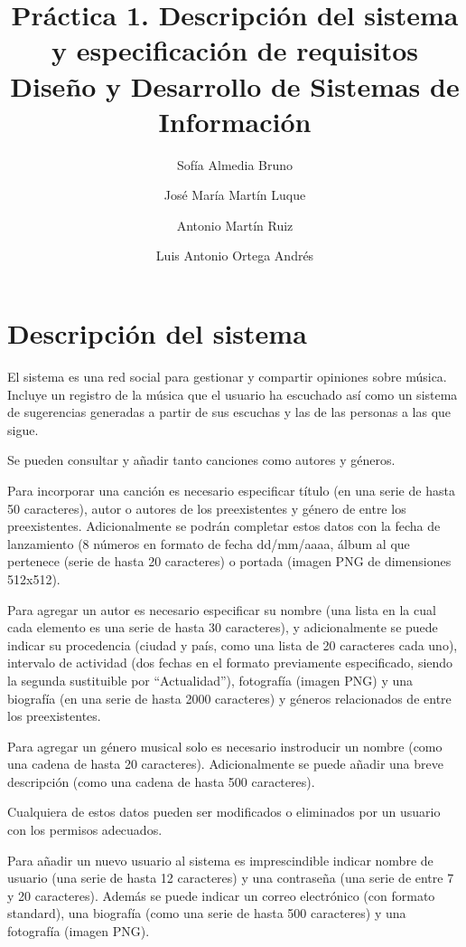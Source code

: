 \documentclass[11pt,a4paper]{article}
\title{Práctica 1. Descripción del sistema y especificación de requisitos \large Diseño y Desarrollo de Sistemas de Información}
\author{Sofía Almedia Bruno \and José María Martín Luque \and Antonio Martín Ruiz \and Luis Antonio Ortega Andrés}
\begin{document}
\maketitle

\section{Descripción del sistema} %

El sistema es una red social para gestionar y compartir opiniones sobre música. Incluye un registro de la música que el usuario ha escuchado así como un sistema de sugerencias generadas a partir de sus escuchas y las de las personas a las que sigue.

Se pueden consultar y añadir tanto canciones como autores y géneros. 

Para incorporar una canción es necesario especificar título (en una serie de hasta 50 caracteres), autor o autores de los preexistentes y género de entre los preexistentes. Adicionalmente se podrán completar estos datos con la fecha de lanzamiento (8 números en formato de fecha dd/mm/aaaa, álbum al que pertenece (serie de hasta 20 caracteres) o portada (imagen PNG de dimensiones 512x512).

Para agregar un autor es necesario especificar su nombre (una lista en la cual cada elemento es una serie de hasta 30 caracteres), y adicionalmente se puede indicar su procedencia (ciudad y país, como una lista de 20 caracteres cada uno), intervalo de actividad (dos fechas en el formato previamente especificado, siendo la segunda sustituible por ``Actualidad''), fotografía (imagen PNG) y una biografía (en una serie de hasta 2000 caracteres) y géneros relacionados de entre los preexistentes.

Para agregar un género musical solo es necesario instroducir un nombre (como una cadena de hasta 20 caracteres). Adicionalmente se puede añadir una breve descripción (como una cadena de hasta 500 caracteres).

Cualquiera de estos datos pueden ser modificados o eliminados por un usuario con los permisos adecuados.


Para añadir un nuevo usuario al sistema es imprescindible indicar nombre de usuario (una serie de hasta 12 caracteres) y una contraseña (una serie de entre 7 y 20 caracteres). Además se puede indicar un correo electrónico (con formato standard), una biografía (como una serie de hasta 500 caracteres) y una fotografía (imagen PNG). 
\end{document}
